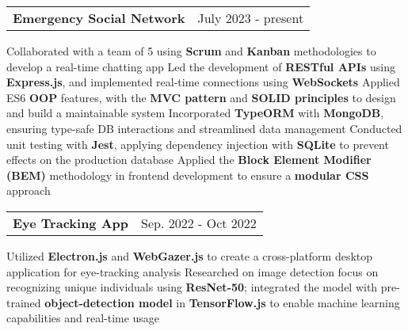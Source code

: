 \newcommand{\resumeProjEntry}[2]{
    \vspace{5pt}\item
      \begin{tabular*}{0.97\textwidth}{l@{\extracolsep{\fill}}r}
        \textbf{#1} & \small #2\\
      \end{tabular*}\vspace{-5pt}
}

\resumeProjEntry
{Emergency Social Network}
{July 2023 - present}
{
    \resumeItemListStart
        \resumeItem
        {Collaborated with a team of 5 using \textbf{Scrum} and \textbf{Kanban} methodologies to develop a real-time chatting app}
        \resumeItem
        {Led the development of \textbf{RESTful APIs} using \textbf{Express.js}, and implemented real-time connections using \textbf{WebSockets}}
        \resumeItem
        {Applied ES6 \textbf{OOP} features, with the \textbf{MVC pattern} and \textbf{SOLID principles} to design and build a maintainable system}
        \resumeItem
        {Incorporated \textbf{TypeORM} with \textbf{MongoDB}, ensuring type-safe DB interactions and streamlined data management}
        \resumeItem
        {Conducted unit testing with \textbf{Jest}, applying dependency injection with \textbf{SQLite} to prevent effects on the production database}
        \resumeItem
        {Applied the \textbf{Block Element Modifier (BEM)} methodology in frontend development to ensure a \textbf{modular CSS} approach}
    \resumeItemListEnd
}

\resumeProjEntry
{Eye Tracking App}
{Sep. 2022 - Oct 2022}
{
    \resumeItemListStart
        \resumeItem
        {Utilized \textbf{Electron.js} and \textbf{WebGazer.js} to create a cross-platform desktop application for eye-tracking analysis}
        \resumeItem
        {Researched on image detection focus on recognizing unique individuals using \textbf{ResNet-50}; integrated the model with pre-trained \textbf{object-detection model} in \textbf{TensorFlow.js} to enable machine learning capabilities and real-time usage}
    \resumeItemListEnd
}




